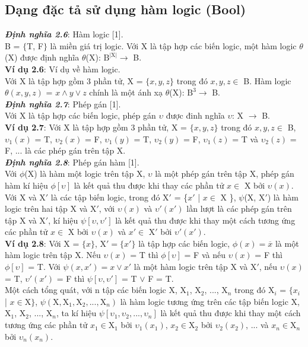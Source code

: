 \documentclass[a4paper,13pt,oneside,openany]{book}
\begin{document}
\begin{flushleft}
		\section{Dạng đặc tả sử dụng hàm logic (Bool)}
		\textbf{\textit{Định nghĩa 2.6}}: Hàm logic [1].\\
		B = $\{$T, F$\}$ là miền giá trị logic. Với X là tập hợp các biến logic, một hàm logic $\theta$(X) được định nghĩa $\theta$(X): $\textrm{B}^\textrm{{|X|}} \rightarrow$ B.\\
		\textbf{Ví dụ 2.6}: Ví dụ về hàm logic.\\
		Với X là tập hợp gồm 3 phần tử, X = $\{x, y, z\}$ trong đó $x, y, z \in$ B. Hàm logic $\theta(x, y, z)$ = $x \land y \lor z$ chính là một ánh xạ $\theta$(X): $\textrm{B}^3 \rightarrow$ B.\\
		\textbf{\textit{Định nghĩa 2.7}}: Phép gán [1].\\
		Với X là tập hợp các biến logic, phép gán $\upsilon$ được đinh nghĩa $\upsilon$: X $\rightarrow$ B.\\
		\textbf{Ví dụ 2.7}: Với X là tập hợp gồm 3 phần tử, X = $\{x, y, z\}$ trong đó $x, y, z \in$ B, $\upsilon_1(x)$ = T, $\upsilon_2(x)$ = F, $\upsilon_1(y)$ = T, $\upsilon_2(y)$ = F, $\upsilon_1(z)$ = T và $\upsilon_2(z)$ = F, ... là các phép gán trên tập X.\\
		\textbf{\textit{Định nghĩa 2.8}}: Phép gán hàm [1].\\
		Với $\phi$(X) là hàm một logic trên tập X, $\upsilon$ là một phép gán trên tập X, phép gán hàm kí hiệu $\phi[\upsilon]$ là kết quả thu được khi thay các phần tử $x \in$ X bởi $\upsilon(x)$.
		Với X và $\textrm{X}'$ là các tập biến logic, trong đó $\textrm{X}'$ = \{$x'$ | $x \in$ X \}, $\psi$(X, $\textrm{X}'$) là hàm logic trên hai tập X và $\textrm{X}'$, với $\upsilon(x)$ và $\upsilon'(x')$ lần lượt là các phép gán trên tập X và $\textrm{X}'$, kí hiệu $\psi[\upsilon, \upsilon']$ là kết quả thu được khi thay một cách tương ứng các phần tử $x \in$ X bởi $\upsilon(x)$ và $x' \in$ $\textrm{X}'$ bởi $\upsilon'(x')$.\\
		\textbf{Ví dụ 2.8}: Với X = $\{x\}$, $\textrm{X}' = \{x'\}$ là tập hợp các biến logic, $\phi(x) = \overline{x}$ là một hàm logic trên tập X. Nếu $\upsilon(x)$ = T thì $\phi[\upsilon]$ = F và nếu $\upsilon(x)$ = F thì $\phi[\upsilon]$ = T. Với $\psi(x, x') = x \lor x'$ là một hàm logic trên tập X và $\textrm{X}'$, nếu $\upsilon(x)$ = T, $\upsilon'(x')$ = F thì $\psi[\upsilon, \upsilon']$ = T $\lor$ F = T.\\
		Một cách tổng quát, với n tập các biến logic X, $\textrm{X}_1$, $\textrm{X}_2$, ..., $\textrm{X}_n$ trong đó $\textrm{X}_i$ = $\{x_i$ | $x \in \textrm{X}\}$, $\psi(\textrm{X}, \textrm{X}_1, \textrm{X}_2, ..., \textrm{X}_n)$ là hàm logic tương ứng trên các tập biến logic X, $\textrm{X}_1$, $\textrm{X}_2$, ..., $\textrm{X}_n$, ta kí hiệu $\psi[\upsilon_1, \upsilon_2, ..., \upsilon_n]$ là kết quả thu được khi thay một cách tương ứng các phần tử $x_1 \in \textrm{X}_1$ bởi $\upsilon_1(x_1)$, $x_2 \in \textrm{X}_2$ bởi $\upsilon_2(x_2)$, ... và $x_n \in \textrm{X}_n$ bởi $\upsilon_n(x_n)$.\\

\end{flushleft}
\end{document}
